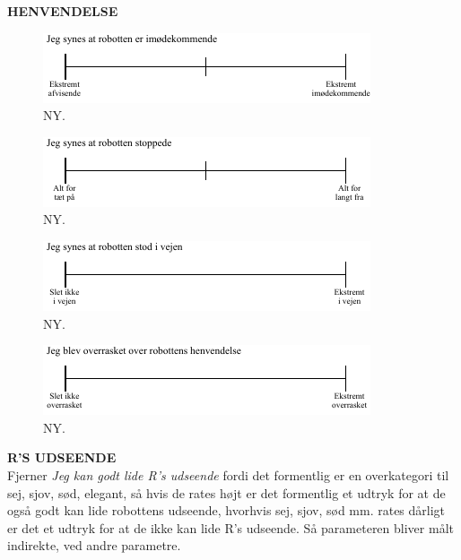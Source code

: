 \textbf{HENVENDELSE}\\
%
\begin{figure}[H]
\centering
\includegraphics[width =\textwidth]{Figure/UdvalgteSkalaer/Imoedekommende} 
\caption{NY.}
\label{fig:SkalaImoedekommende}
\end{figure}
\noindent
%
%
\begin{figure}[H]
\centering
\includegraphics[width =\textwidth]{Figure/UdvalgteSkalaer/RStoppede} 
\caption{NY.}
\label{fig:SkalaRStoppede}
\end{figure}
\noindent
%
%
\begin{figure}[H]
\centering
\includegraphics[width =\textwidth]{Figure/UdvalgteSkalaer/RobottenErIVejen} 
\caption{NY.}
\label{fig:SkalaRerIVejen}
\end{figure}
\noindent
%
%
\begin{figure}[H]
\centering
\includegraphics[width =\textwidth]{Figure/UdvalgteSkalaer/OverrasketOverR} 
\caption{NY.}
\label{fig:SkalaOverrasketOverR}
\end{figure}
\noindent
%
\textbf{R'S UDSEENDE}\\
Fjerner \textit{Jeg kan godt lide R's udseende} fordi det formentlig er en overkategori til sej, sjov, sød, elegant, så hvis de rates højt er det formentlig et udtryk for at de også godt kan lide robottens udseende, hvorhvis sej, sjov, sød mm. rates dårligt er det et udtryk for at de ikke kan lide R's udseende. Så parameteren bliver målt indirekte, ved andre parametre.
